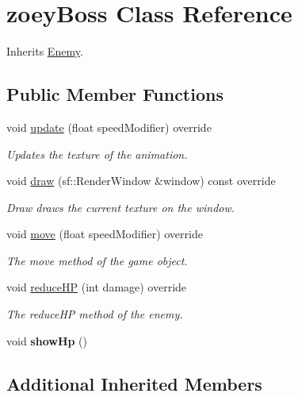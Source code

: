 \hypertarget{classzoey_boss}{\section{zoey\+Boss Class Reference}
\label{classzoey_boss}
}


Inherits \hyperlink{class_enemy}{Enemy}.

\subsection*{Public Member Functions}
\begin{DoxyCompactItemize}
\item 
void \hyperlink{classzoey_boss_aa712b8f9050e3851cb0133927acd3f54}{update} (float speed\+Modifier) override
\begin{DoxyCompactList}\small\item\em Updates the texture of the animation. \end{DoxyCompactList}\item 
void \hyperlink{classzoey_boss_afbf4886e5a325c17a0366b631d274e19}{draw} (sf\+::\+Render\+Window \&window) const override
\begin{DoxyCompactList}\small\item\em Draw draws the current texture on the window. \end{DoxyCompactList}\item 
void \hyperlink{classzoey_boss_a6c371465ec647b81299a0ffebaa8ee4c}{move} (float speed\+Modifier) override
\begin{DoxyCompactList}\small\item\em The move method of the game object. \end{DoxyCompactList}\item 
void \hyperlink{classzoey_boss_a19ddca3c55bb7b4b21aef462bd5d814c}{reduce\+H\+P} (int damage) override
\begin{DoxyCompactList}\small\item\em The reduce\+H\+P method of the enemy. \end{DoxyCompactList}\item 
\hypertarget{classzoey_boss_ae70c0773e30ab34f2c12ca816eb582cd}{void {\bfseries show\+Hp} ()}\label{classzoey_boss_ae70c0773e30ab34f2c12ca816eb582cd}

\end{DoxyCompactItemize}
\subsection*{Additional Inherited Members}


